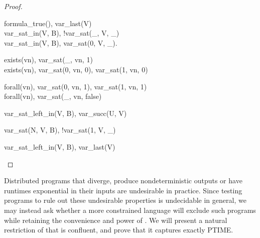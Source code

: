 \begin{proof}
\begin{Drules}
        {formula\_true(), var\_last(V)} \\
        {var\_sat\_in(V, B), !var\_sat(\_, V, \_)} \\
        {var\_sat\_in(V, B), var\_sat(0, V, \_).} \\
\end{Drules}

\begin{Drules}
        {exists(vn), var\_sat(\_, vn, 1)} \\
        {exists(vn), var\_sat(0, vn, 0), var\_sat(1, vn, 0)} \\
\end{Drules}

\begin{Drules}
        {forall(vn), var\_sat(0, vn, 1), var\_sat(1, vn, 1)} \\
        {forall(vn), var\_sat(\_, vn, false)} \\
\end{Drules}

\begin{Drules}
        {var\_sat\_left\_in(V, B), var\_succ(U, V)} \\
\end{Drules}

\begin{Drules}
        {var\_sat(N, V, B), !var\_sat(1, V, \_)} \\
\end{Drules}

\begin{Drules}
        {var\_sat\_left\_in(V, B), var\_last(V)}
\end{Drules}
\end{proof}



Distributed programs that diverge, produce nondeterministic outputs or have runtimes exponential in their inputs are undesirable in practice.
Since testing \lang programs to rule out these undesirable properties is undecidable in general, we may instead ask whether a more
constrained language will exclude such programs while retaining the convenience and power of \lang.
We will present a natural restriction of \lang that is confluent, and prove that it captures exactly PTIME.


